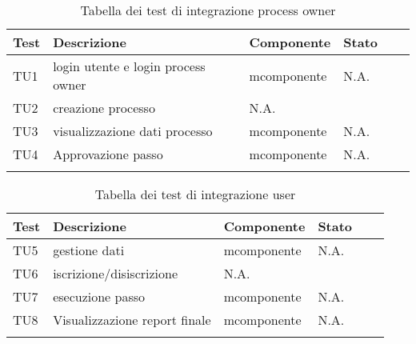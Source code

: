 \begin{longtable}{llllXr}%
\toprule
\textbf{Test} & \textbf{Descrizione} & \textbf{Componente} & \textbf{Stato}\\
\toprule
TU1&login utente e login process owner &mcomponente&N.A.\\
\midrule
TU2&creazione processo&N.A.\\
\midrule
TU3&visualizzazione dati processo&mcomponente&N.A.\\
\midrule
TU4&Approvazione passo&mcomponente&N.A.\\
\bottomrule
\caption{Tabella dei test di integrazione process owner}
\end{longtable}
\begin{longtable}{llllXr}%
\toprule
\textbf{Test} & \textbf{Descrizione} & \textbf{Componente} & \textbf{Stato}\\
\toprule
TU5&gestione dati&mcomponente&N.A.\\
\midrule
TU6&iscrizione/disiscrizione&N.A.\\
\midrule
TU7&esecuzione passo&mcomponente&N.A.\\
\midrule
TU8&Visualizzazione report finale&mcomponente&N.A.\\
\bottomrule
\caption{Tabella dei test di integrazione user}
\end{longtable}